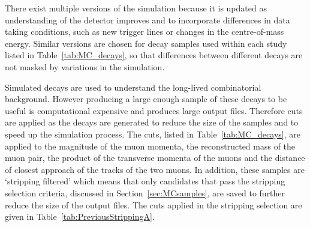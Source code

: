 There exist multiple versions of the simulation because it is updated as understanding of the detector improves and to incorporate differences in data taking conditions, such as new trigger lines or changes in the centre-of-mass energy. 
Similar versions are chosen for decay samples used within each study listed in Table~\ref{tab:MC_decays}, so that differences between different decays are not masked by variations in the simulation.%




Simulated \bbbarmumux decays are used to understand the long-lived combinatorial background. However producing a large enough sample of these decays to be useful is computational expensive and produces large output files. Therefore cuts are applied as the decays are generated to reduce the size of the samples and to speed up the simulation process. The cuts, listed in Table~\ref{tab:MC_decays}, are applied to the magnitude of the muon momenta, the reconstructed mass of the muon pair, the product of the transverse momenta of the muons and the distance of closest approach of the tracks of the two muons. In addition, these samples are `stripping filtered' which means that only candidates that pass the \bmumu stripping selection criteria, discussed in Section~\ref{sec:MCsamples}, are saved to further reduce the size of the output files. The cuts applied in the stripping selection are given in Table~\ref{tab:PreviousStrippingA}.%
  

